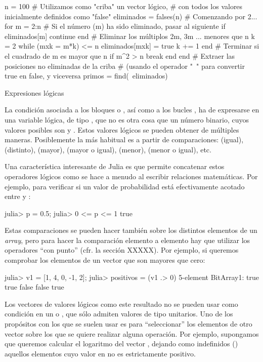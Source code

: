 ﻿\documentclass[spanish]{article}
\begin{document}
n = 100
# Utilizamos como "criba" un vector lógico,
# con todos los valores inicialmente definidos como "false"
eliminados = falses(n)
# Comenzando por 2...
for m = 2:n
  # Si el número (m) ha sido eliminado, pasar al siguiente
  if eliminados[m]
    continue
  end
  # Eliminar los múltiplos 2m, 3m ... menores que n
  k = 2
  while (mxk = m*k) <= n
    eliminados[mxk] = true
    k += 1
  end
  # Terminar si el cuadrado de m es mayor que n 
  if m^2 > n
    break
  end
end
# Extraer las posiciones no eliminadas de la criba
# (usando el operador "~" para convertir true en false, y viceversa
primos = find(~eliminados)


Expresiones lógicas

La condición asociada a los bloques  o , así como a los bucles , ha de expresarse en una variable lógica, de tipo , que no es otra cosa que un número binario, cuyos valores posibles son  y . Estos valores lógicos se pueden obtener de múltiples maneras. Posiblemente la más habitual es a partir de comparaciones:
\code{==} (igual), \code{!=} (distinto),
\code{>} (mayor), \code{>=} (mayor o igual),
\code{<} (menor), \code{<=} (menor o igual), etc.

Una característica interesante de Julia es que permite concatenar estos operadores lógicos como se hace a menudo al escribir relaciones matemáticas. Por ejemplo, para verificar si un valor de probabilidad  está efectivamente acotado entre  y :

julia> p = 0.5;
julia> 0 <= p <= 1
true

Estas comparaciones se pueden hacer también sobre los distintos elementos de un \emph{array}, pero para hacer la comparación elemento a elemento hay que utilizar los operadores ``con punto'' (cfr. la sección XXXXX). Por ejemplo, si queremos comprobar los elementos de un vector que son mayores que cero:

julia> v1 = [1, 4, 0, -1, 2];
julia> positivos = (v1 .> 0)
5-element BitArray{1}:
  true
  true
 false
 false
  true

Los vectores de valores lógicos como este resultado no se pueden usar como condición en un  o , que sólo admiten valores de tipo  unitarios. Uno de los propósitos con los que se suelen usar es para ``seleccionar'' los elementos de otro vector sobre los que se quiere realizar alguna operación. Por ejemplo, supongamos que queremos calcular el logaritmo del vector , dejando como indefinidos () aquellos elementos cuyo valor en  no es estrictamente positivo.
\end{document}
